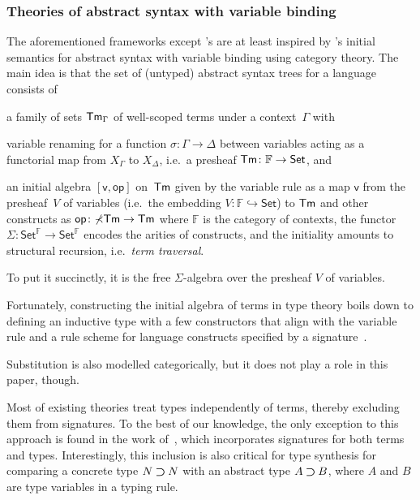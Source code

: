 \subsubsection{Theories of abstract syntax with variable binding}\label{sec:theory-of-syntax}
The aforementioned frameworks except \citeauthor{Gheri2020}'s are at least inspired by \citet{Fiore1999}'s initial semantics for abstract syntax with variable binding using category theory.
The main idea is that the set of (untyped) abstract syntax trees for a language consists of
\begin{enumerate*}
  \item a family of sets $\mathsf{Tm}_{\Gamma}$ of well-scoped terms under a context~$\Gamma$ with
  \item variable renaming for a function $\sigma\colon \Gamma \to \Delta$ between variables acting as a functorial map from $X_{\Gamma}$ to $X_{\Delta}$, i.e.\ a presheaf $\mathsf{Tm}\colon \mathbb{F} \to \mathsf{Set}$, and
  \item an initial algebra $[\mathsf{v}, \mathsf{op}]$ on~$\mathsf{Tm}$ given by the variable rule as a map $\mathsf{v}$ from the presheaf~$V$ of variables (i.e.\ the embedding $V\colon \mathbb{F} \hookrightarrow \mathsf{Set}$) to $\mathsf{Tm}$ and other constructs as $\mathsf{op}\colon \mathbb{\Sigma}\mathsf{Tm} \to \mathsf{Tm}$ where $\mathbb{F}$ is the category of contexts, the functor $\mathbb{\Sigma}\colon \mathsf{Set}^\mathbb{F} \to \mathsf{Set}^\mathbb{F}$ encodes the arities of constructs, and the initiality amounts to structural recursion, i.e.\ \emph{term traversal}.
\end{enumerate*}
To put it succinctly, it is the free $\mathbb{\Sigma}$-algebra over the presheaf $V$ of variables.

Fortunately, constructing the initial algebra of terms in type theory boils down to defining an inductive type with a few constructors that align with the variable rule and a rule scheme for language constructs specified by a signature~\citep{Fiore2022}.

Substitution is also modelled categorically, but it does not play a role in this paper, though.

\begin{remark} \label{re:type-signature}
Most of existing theories treat types independently of terms, thereby excluding them from signatures.
To the best of our knowledge, the only exception to this approach is found in the work of~\citet{Arkor2020}, which incorporates signatures for both terms and types.
Interestingly, this inclusion is also critical for type synthesis for comparing a concrete type $N \mathbin{\bm{\supset}} N$ with an abstract type $A \mathbin{\bm{\supset}} B$, where $A$ and $B$ are type variables in a typing rule.
\end{remark}

